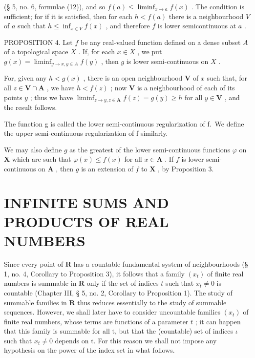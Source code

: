(§ 5, no. 6, formulae (12)), and so \(f(a) \leqslant \liminf_{x \to a} f(x)\) . The condition is sufficient; for if it is satisfied, then for each \(h < f(a)\) there is a neighbourhood \(V\) of \(a\) such that \(h \leqslant \inf_{x \in V} f(x)\) , and therefore \(f\) is lower semicontinuous at \(a\) .

PROPOSITION 4. Let \(f\) be any real-valued function defined on a dense subset \(A\) of a topological space \(X\) . If, for each \(x \in X\) , we put \(g(x) = \liminf_{y \to x, y \in A} f(y)\) , then \(g\) is lower semi-continuous on \(X\) .

For, given any \(h < g(x)\) , there is an open neighbourhood \(\mathbf{V}\) of \(x\) such that, for all \(z \in \mathbf{V} \cap \mathbf{A}\) , we have \(h < f(z)\) ; now \(\mathbf{V}\) is a neighbourhood of each of its points \(y\) ; thus we have \(\liminf_{z \to y, z \in \mathbf{A}} f(z) = g(y) \geqslant h\) for all \(y \in \mathbf{V}\) , and the result follows.

The function g is called the lower semi-continuous regularization of f.~We define the upper semi-continuous regularization of f similarly.

We may also define \(g\) as the greatest of the lower semi-continuous functions \(\varphi\) on \(\mathbf{X}\) which are such that \(\varphi(x) \leqslant f(x)\) for all \(x \in \mathbf{A}\) . If \(f\) is lower semi-continuous on \(\mathbf{A}\) , then \(g\) is an extension of \(f\) to \(\mathbf{X}\) , by Proposition 3.

\section{INFINITE SUMS AND PRODUCTS OF REAL NUMBERS}

Since every point of \(\mathbf{R}\) has a countable fundamental system of neighbourhoods (§ 1, no. 4, Corollary to Proposition 3), it follows that a family \((x_{t})\) of finite real numbers is summable in \(\mathbf{R}\) only if the set of indices \(t\) such that \(x_{t} \neq 0\) is countable (Chapter III, § 5, no. 2, Corollary to Proposition 1). The study of summable families in \(\mathbf{R}\) thus reduces essentially to the study of summable sequences. However, we shall later have to consider uncountable families \((x_{t})\) of finite real numbers, whose terms are functions of a parameter \(t\) ; it can happen that this family is summable for all t, but that the (countable) set of indices \(\iota\) such that \(x_{t} \neq 0\) depends on t. For this reason we shall not impose any hypothesis on the power of the index set in what follows.

